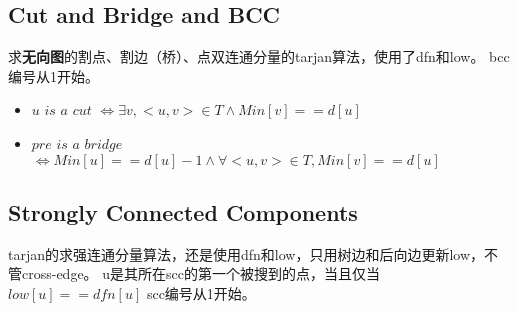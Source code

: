 	\subsection{Cut and Bridge and BCC}
		\begin{flushleft}
			求\textbf{无向图}的割点、割边（桥）、点双连通分量的tarjan算法，使用了dfn和low。
			\linebreak bcc编号从1开始。
		\end{flushleft}
		
		\begin{itemize}
			\item $u$ $is$ $a$ $cut$ $\Leftrightarrow \exists v, <u, v> \in T \wedge Min[v] == d[u]$
			\item $pre$ $is$ $a$ $bridge$ $\Leftrightarrow Min[u] == d[u] - 1 \wedge \forall <u, v> \in T, Min[v] == d[u]$
		\end{itemize}
	\newpage
	\subsection{Strongly Connected Components}
		\begin{flushleft}
			tarjan的求强连通分量算法，还是使用dfn和low，只用树边和后向边更新low，不管cross-edge。
			\linebreak u是其所在scc的第一个被搜到的点，当且仅当$low[u] == dfn[u]$
			\linebreak scc编号从1开始。
		\end{flushleft}
		